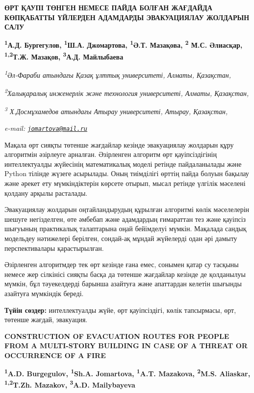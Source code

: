 \begin{articleheader}
{\bfseries ӨРТ ҚАУПІ ТӨНГЕН НЕМЕСЕ ПАЙДА БОЛҒАН ЖАҒДАЙДА КӨПҚАБАТТЫ ҮЙЛЕРДЕН АДАМДАРДЫ ЭВАКУАЦИЯЛАУ ЖОЛДАРЫН САЛУ}

{\bfseries \textsuperscript{1}А.Д. Бургегулов,
\textsuperscript{1}Ш.А. Джомартова\textsuperscript{\envelope },
\textsuperscript{1}Ә.Т. Мазақова,
\textsuperscript{2} М.С. Әлиасқар,
\textsuperscript{1,2}Т.Ж. Мазақов,
\textsuperscript{3}А.Д. Майлыбаева}
\end{articleheader}

\begin{affiliation}
\emph{\textsuperscript{1}Әл-Фараби атындағы Қазақ ұлттық университеті, Алматы, Қазақстан,}

\emph{\textsuperscript{2}Халықаралық инженерлік және технология университеті, Алматы, Қазақстан,}

\emph{\textsuperscript{3} Х.Досмұхамедов атындағы Атырау университеті, Атырау, Қазақстан,}

\emph{e-mail: \href{mailto:jomartova@mail.ru}{\nolinkurl{jomartova@mail.ru}}}
\end{affiliation}

Мақала өрт сияқты төтенше жағдайлар кезінде эвакуациялау жолдарын құру
алгоритмін әзірлеуге арналған. Әзірленген алгоритм өрт қауіпсіздігінің
интеллектуалды жүйесінің математикалық моделі ретінде пайдаланылады және
Python тілінде жүзеге асырылады. Оның тиімділігі өрттің пайда болуын
бақылау және әрекет ету мүмкіндіктерін көрсете отырып, мысал ретінде
үлгілік мәселені қолдану арқылы расталады.

Эвакуациялау жолдарын оңтайландырудың құрылған алгоритмі көлік
мәселелерін шешуге негізделген, өте әмбебап және адамдардың ғимараттан
тез және қауіпсіз шығуының практикалық талаптарына оңай бейімделуі
мүмкін. Мақалада сандық модельдеу нәтижелері берілген, сондай-ақ мұндай
жүйелерді одан әрі дамыту перспективалары қарастырылған.

Әзірленген алгоритмдер тек өрт кезінде ғана емес, сонымен қатар су
тасқыны немесе жер сілкінісі сияқты басқа да төтенше жағдайлар кезінде
де қолданылуы мүмкін, бұл тәуекелдерді барынша азайтуға және апаттардан
келетін шығынды азайтуға мүмкіндік береді.

{\bfseries Түйін сөздер:} интеллектуалды жүйе, өрт қауіпсіздігі, көлік
тапсырмасы, өрт, төтенше жағдай, эвакуация.

\begin{articleheader}
{\bfseries CONSTRUCTION OF EVACUATION ROUTES FOR PEOPLE FROM A MULTI-STORY BUILDING IN CASE OF A THREAT OR OCCURRENCE OF A FIRE}

{\bfseries
\textsuperscript{1}A.D. Burgegulov,
\textsuperscript{1}Sh.A. Jomartova\textsuperscript{\envelope },
\textsuperscript{1}A.T. Mazakova,
\textsuperscript{2}M.S. Aliaskar,
\textsuperscript{1,2}T.Zh. Mazakov,
\textsuperscript{3}A.D. Mailybayeva}
\end{articleheader}

